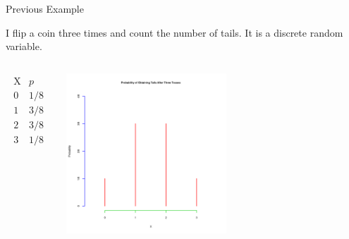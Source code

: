 \begin{frame}{Previous Example}

  I flip a coin three times and count the number of tails. It is a
  discrete random variable.

  \begin{columns}

    \begin{eqnarray*}
      \begin{array}{l|l}
        \mathrm{X} & p \\ \hline
        0  & 1/8 \\
        1  & 3/8 \\
        2  & 3/8 \\
        3  & 1/8
      \end{array}
    \end{eqnarray*}


    \includegraphics[width=6cm]{img/probDist3Tosses}

  \end{columns}
  
  
\end{frame}


